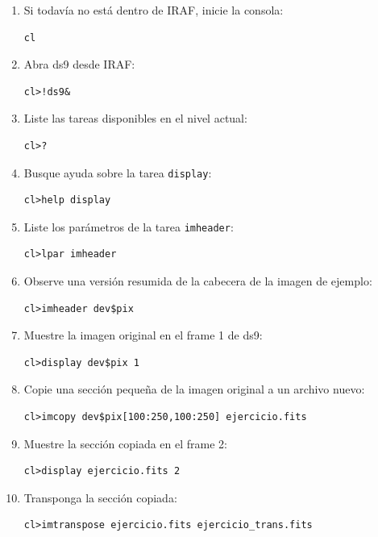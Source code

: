 \begin{enumerate}

\item Si todavía no está dentro de IRAF, inicie la consola:
\begin{verbatim}
cl
\end{verbatim}

\item Abra ds9 desde IRAF:
\begin{verbatim}
cl>!ds9&
\end{verbatim}

\item Liste las tareas disponibles en el nivel actual:
\begin{verbatim}
cl>?
\end{verbatim}

\item Busque ayuda sobre la tarea \texttt{display}:
\begin{verbatim}
cl>help display
\end{verbatim}

\item Liste los parámetros de la tarea \texttt{imheader}:
\begin{verbatim}
cl>lpar imheader
\end{verbatim}

\item Observe una versión resumida de la cabecera de la imagen de ejemplo:
\begin{verbatim}
cl>imheader dev$pix
\end{verbatim}

\item Muestre la imagen original en el frame 1 de ds9:
\begin{verbatim}
cl>display dev$pix 1
\end{verbatim}

\item Copie una sección pequeña de la imagen original a un archivo nuevo:
\begin{verbatim}
cl>imcopy dev$pix[100:250,100:250] ejercicio.fits
\end{verbatim}

\item Muestre la sección copiada en el frame 2:
\begin{verbatim}
cl>display ejercicio.fits 2
\end{verbatim}

\item Transponga la sección copiada:
\begin{verbatim}
cl>imtranspose ejercicio.fits ejercicio_trans.fits
\end{verbatim}


\end{enumerate}
